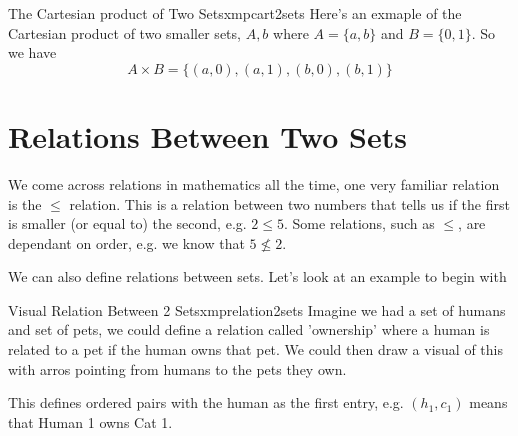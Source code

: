 \vspace{1cm}

\begin{exmpl}[label={exmpl: cart2sets}]{The Cartesian product of Two Sets}{xmpcart2sets}
    Here's an exmaple of the Cartesian product of two smaller sets, $A,b$ where $A = \{a,b\}$ and $B = \{0,1\}$. So we have
    $$A \times B = \{(a,0), (a,1),(b,0),(b,1) \}$$
\end{exmpl}

\section{Relations Between Two Sets}
We come across relations in mathematics all the time, one very familiar relation is the $\leq$ relation. This is a relation between two numbers that tells us if the first is smaller (or equal to) the second, e.g. $2 \leq 5$. Some relations, such as $\leq$, are dependant on order, e.g. we know that $5 \not\leq 2$.

We can also define relations between sets. Let's look at an example to begin with

\begin{exmpl}[label={exmpl: relation2sets}]{Visual Relation Between 2 Sets}{xmprelation2sets}
    Imagine we had a set of humans and set of pets, we could define a relation called 'ownership' where a human is related to a pet if the human owns that pet. We could then draw a visual of this with arros pointing from humans to the pets they own.
    \begin{center}
    \end{center}
    This defines ordered pairs with the human as the first entry, e.g. $(h_1, c_1)$ means that Human 1 owns Cat 1.
\end{exmpl}


